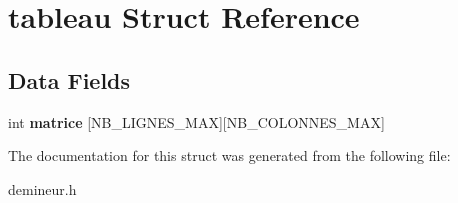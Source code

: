 \hypertarget{structtableau}{
\section{tableau Struct Reference}
\label{structtableau}
}
\subsection*{Data Fields}
\begin{DoxyCompactItemize}
\item 
\hypertarget{structtableau_ac29a8a150081ee909db46df81873924c}{
int {\bfseries matrice} \mbox{[}NB\_\-LIGNES\_\-MAX\mbox{]}\mbox{[}NB\_\-COLONNES\_\-MAX\mbox{]}}
\label{structtableau_ac29a8a150081ee909db46df81873924c}

\end{DoxyCompactItemize}


The documentation for this struct was generated from the following file:\begin{DoxyCompactItemize}
\item 
demineur.h\end{DoxyCompactItemize}
